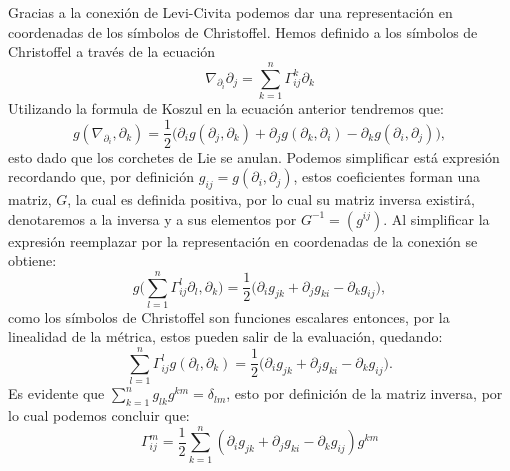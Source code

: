 Gracias a la conexión de Levi-Civita podemos dar una representación en coordenadas de los símbolos de Christoffel. Hemos definido a los símbolos de Christoffel a través de la ecuación
\[
	\nabla_{\partial_{i}} \partial_{j} = \sum_{k=1}^{n} \Gamma_{ij}^{k} \partial_{k}
\]
Utilizando la formula de Koszul en la ecuación anterior tendremos que:
\[
	g(\nabla_{\partial_{i}}, \partial_{k}) = \frac{1}{2} \biggl(\partial_{i}g(\partial_{j},\partial_{k}) + \partial_{j}g(\partial_{k},\partial_{i}) - \partial_{k}g(\partial_{i},\partial_{j})\biggr),
\]
esto dado que los corchetes de Lie se anulan. Podemos simplificar está expresión recordando que, por definición $g_{ij} = g(\partial_{i}, \partial_{j})$, estos coeficientes forman una matriz, $G$, la cual es definida positiva, por lo cual su matriz inversa existirá, denotaremos a la inversa y a sus elementos por $G^{-1}=(g^{ij})$. Al simplificar la expresión reemplazar por la representación en coordenadas de la conexión se obtiene:
\[
  g\biggl(\sum_{l=1}^{n} \Gamma^{l}_{ij}\partial_{l}, \partial_{k}\biggr) = \frac{1}{2} \biggl( \partial_{i}g_{jk} + \partial_{j}g_{ki} - \partial_{k}g_{ij}\biggr),
\]
como los símbolos de Christoffel son funciones escalares entonces, por la linealidad de la métrica, estos pueden salir de la evaluación, quedando:
\[
	\sum_{l=1}^{n} \Gamma^{l}_{ij} g(\partial_{l}, \partial_{k}) = \frac{1}{2} \biggl( \partial_{i}g_{jk} + \partial_{j}g_{ki} - \partial_{k}g_{ij}\biggr).
\]
Es evidente que $\sum_{k=1}^{n}g_{lk}g^{km} = \delta_{lm}$, esto por definición de la matriz inversa, por lo cual podemos concluir que:
\[
  \Gamma_{ij}^{m} = \frac{1}{2}\sum_{k=1}^{n} (\partial_{i}g_{jk} + \partial_{j}g_{ki} - \partial_{k}g_{ij})g^{km}
\]
